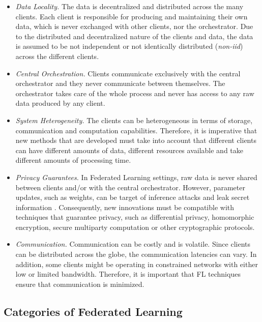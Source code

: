 \begin{itemize}
    \item \textit{Data Locality.} The data is decentralized and distributed across the many clients. Each client is responsible for producing and maintaining their own data, which is never exchanged with other clients, nor the orchestrator. Due to the distributed and decentralized nature of the clients and data, the data is assumed to be not independent or not identically distributed (\textit{non-iid}) across the different clients.
    
    \item \textit{Central Orchestration.} Clients communicate exclusively with the central orchestrator and they never communicate between themselves. The orchestrator takes care of the whole process and never has access to any raw data produced by any client.
    
    \item \textit{System Heterogeneity.} The clients can be heterogeneous in terms of storage, communication and computation capabilities. Therefore, it is imperative that new methods that are developed must take into account that different clients can have different amounts of data, different resources available and take different amounts of processing time.
    
    \item \textit{Privacy Guarantees.} In Federated Learning settings, raw data is never shared between clients and/or with the central orchestrator. However, parameter updates, such as weights, can be target of inference attacks and leak secret information \cite{10.1145/3298981}. Consequently, new innovations must be compatible with techniques that guarantee privacy, such as differential privacy, homomorphic encryption, secure multiparty computation or other cryptographic protocols.
    
    \item \textit{Communication.} Communication can be costly and is volatile. Since clients can be distributed across the globe, the communication latencies can vary. In addition, some clients might be operating in constrained networks with either low or limited bandwidth. Therefore, it is important that FL techniques ensure that communication is minimized.

\end{itemize}

\subsection{Categories of Federated Learning}


